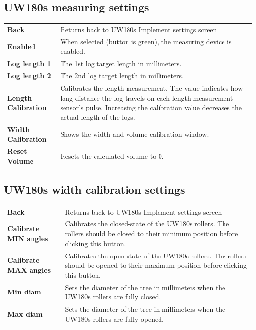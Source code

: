 \documentclass[12pt,a4paper,english]{uvmanual}
\begin{document}
\FloatBarrier
\subsection{UW180s measuring settings}\label{ch:settings_uw180s_meas}


\begin{tabular}{ L{0.2\textwidth} L{0.66\textwidth} }
\textbf{Back} & Returns back to UW180s Implement settings screen \\
\textbf{Enabled} & When selected (button is green), the measuring device is enabled. \\
\textbf{Log length 1} & The 1st log target length in millimeters. \\
\textbf{Log length 2} & The 2nd log target length in millimeters. \\
\textbf{Length Calibration} & Calibrates the length measurement. The value indicates how long distance the log travels on each length measurement sensor's pulse. Increasing the calibration value decreases the actual length of the logs. \\
\textbf{Width Calibration} & Shows the width and volume calibration window. \\
\textbf{Reset Volume} & Resets the calculated volume to 0. \\
\end{tabular}

\FloatBarrier
\subsection{UW180s width calibration settings}\label{ch:settings_uw180s_width}


\begin{tabular}{ L{0.2\textwidth} L{0.66\textwidth} }
\textbf{Back} & Returns back to UW180s Implement settings screen \\
\textbf{Calibrate MIN angles} & Calibrates the closed-state of the UW180s rollers. The rollers should be closed to their minimum position before clicking this button. \\
\textbf{Calibrate MAX angles} & Calibrates the open-state of the UW180s rollers. The rollers should be opened to their maximum position before clicking this button. \\
\textbf{Min diam} & Sets the diameter of the tree in millimeters when the UW180s rollers are fully closed. \\
\textbf{Max diam} & Sets the diameter of the tree in millimeters when the UW180s rollers are fully opened. \\
\end{tabular}
\end{document}
